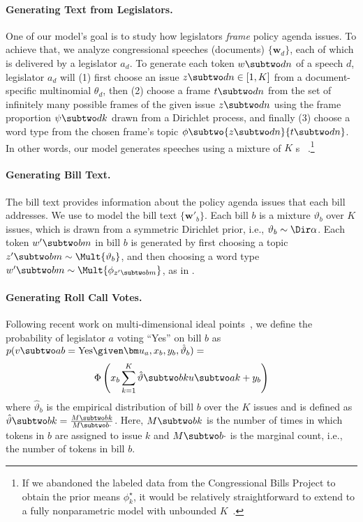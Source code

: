 \paragraph{Generating Text from Legislators.}
One of our model's goal is to study how legislators \textit{frame} policy agenda issues. To achieve that, we analyze congressional speeches (documents) $\{\bm w_d\}$, each of which is delivered by a legislator $a_d$. To generate each token $w \subtwo dn$ of a speech $d$, legislator $a_d$ will (1) first choose an issue $z \subtwo dn \in [1,K]$ from a document-specific multinomial $\theta_d$, then (2) choose a frame $t \subtwo dn$ from the set of infinitely many possible frames of the given issue $z \subtwo dn$ using the frame proportion $\psi \subtwo dk$ drawn from a Dirichlet process, and finally (3) choose a word type from the chosen frame's topic $\phi \subtwo {z \subtwo dn}{t \subtwo dn}$. In other words, our model generates speeches using a mixture of $K$ \hdp{}s ~\cite{Teh:JASA06:hdp}.\footnote{If we abandoned the labeled data from the Congressional Bills Project to obtain the prior means $\phi_k^{\star}$, it would be relatively straightforward to extend to a fully nonparametric model with unbounded $K$~\cite{Ahmed:ICML13:ncrf,Paisley:TPAMI14:nhdp}.}





\paragraph{Generating Bill Text.}
\label{subsec:c6_bill_text}
The bill text provides information about the policy agenda issues that each bill
addresses. We use \lda{} to model the bill text $\{\bm w'_b\}$. Each bill $b$ is
a mixture $\vartheta_b$ over $K$ issues, which is drawn from a symmetric
Dirichlet prior, i.e., $\vartheta_b \sim \Dir \alpha$. Each token $w' \subtwo
bm$ in bill $b$ is generated by first choosing a topic $z' \subtwo bm \sim \Mult
{\vartheta_b}$, and then choosing a word type $w' \subtwo bm \sim \Mult
{\phi_{z' \subtwo bm}}$, as in \lda{}.

\paragraph{Generating Roll Call Votes.}
\label{subsec:c6_vote}
Following recent work on multi-dimensional ideal
points~\cite{Lauderdale:AJPS14,Sim:AAAI15:utility}, we define the probability of
legislator $a$ voting ``Yes'' on bill $b$ as $p(v \subtwo ab = \mbox{Yes} \given
\bm u_a, x_b, y_b,\hat{\vartheta}_b) =$
\begin{equation}
\Phi\left(x_b \sum_{k=1}^K \hat{\vartheta} \subtwo bk u \subtwo ak + y_b\right)
\end{equation}
where $\hat{\vartheta}_b$ is the empirical distribution of bill $b$ over the $K$ issues and is
defined as $\hat{\vartheta} \subtwo bk = \frac{M \subtwo bk}{M \subtwo b{\cdot}}$. Here, $M \subtwo
bk$ is the number of times in which tokens in $b$ are assigned to issue $k$ and $M \subtwo
b{\cdot}$ is the marginal count, i.e., the number of tokens in bill $b$.

